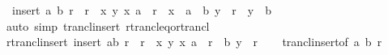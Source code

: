 \begin{isabellebody}
\ \ {\isachardoublequoteopen}{\isacharparenleft}{\kern0pt}insert\ {\isacharparenleft}{\kern0pt}a{\isacharcomma}{\kern0pt}\ b{\isacharparenright}{\kern0pt}\ r{\isacharparenright}{\kern0pt}\isactrlsup {\isacharplus}{\kern0pt}\ {\isacharequal}{\kern0pt}\ r\isactrlsup {\isacharplus}{\kern0pt}\ {\isasymunion}\ {\isacharbraceleft}{\kern0pt}{\isacharparenleft}{\kern0pt}x{\isacharcomma}{\kern0pt}\ y{\isacharparenright}{\kern0pt}{\isachardot}{\kern0pt}\ {\isacharparenleft}{\kern0pt}{\isacharparenleft}{\kern0pt}x{\isacharcomma}{\kern0pt}\ a{\isacharparenright}{\kern0pt}\ {\isasymin}\ r\isactrlsup {\isacharplus}{\kern0pt}\ {\isasymor}\ x\ {\isacharequal}{\kern0pt}\ a{\isacharparenright}{\kern0pt}\ {\isasymand}\ {\isacharparenleft}{\kern0pt}{\isacharparenleft}{\kern0pt}b{\isacharcomma}{\kern0pt}\ y{\isacharparenright}{\kern0pt}\ {\isasymin}\ r\isactrlsup {\isacharplus}{\kern0pt}\ {\isasymor}\ y\ {\isacharequal}{\kern0pt}\ b{\isacharparenright}{\kern0pt}{\isacharbraceright}{\kern0pt}{\isachardoublequoteclose}\isanewline
%
\isadelimproof
\ \ %
\endisadelimproof
%
\isatagproof
{}\isamarkupfalse%
\ {\isacharparenleft}{\kern0pt}auto\ simp{\isacharcolon}{\kern0pt}\ trancl{\isacharunderscore}{\kern0pt}insert\ rtrancl{\isacharunderscore}{\kern0pt}eq{\isacharunderscore}{\kern0pt}or{\isacharunderscore}{\kern0pt}trancl{\isacharparenright}{\kern0pt}%
\endisatagproof
{\isafoldproof}%
%
\isadelimproof
\isanewline
%
\endisadelimproof
\isanewline
{}\isamarkupfalse%
\ rtrancl{\isacharunderscore}{\kern0pt}insert{\isacharcolon}{\kern0pt}\ {\isachardoublequoteopen}{\isacharparenleft}{\kern0pt}insert\ {\isacharparenleft}{\kern0pt}a{\isacharcomma}{\kern0pt}b{\isacharparenright}{\kern0pt}\ r{\isacharparenright}{\kern0pt}\isactrlsup {\isacharasterisk}{\kern0pt}\ {\isacharequal}{\kern0pt}\ r\isactrlsup {\isacharasterisk}{\kern0pt}\ {\isasymunion}\ {\isacharbraceleft}{\kern0pt}{\isacharparenleft}{\kern0pt}x{\isacharcomma}{\kern0pt}\ y{\isacharparenright}{\kern0pt}{\isachardot}{\kern0pt}\ {\isacharparenleft}{\kern0pt}x{\isacharcomma}{\kern0pt}\ a{\isacharparenright}{\kern0pt}\ {\isasymin}\ r\isactrlsup {\isacharasterisk}{\kern0pt}\ {\isasymand}\ {\isacharparenleft}{\kern0pt}b{\isacharcomma}{\kern0pt}\ y{\isacharparenright}{\kern0pt}\ {\isasymin}\ r\isactrlsup {\isacharasterisk}{\kern0pt}{\isacharbraceright}{\kern0pt}{\isachardoublequoteclose}\isanewline
%
\isadelimproof
\ \ %
\endisadelimproof
%
\isatagproof
{}\isamarkupfalse%
\ trancl{\isacharunderscore}{\kern0pt}insert{\isacharbrackleft}{\kern0pt}of\ a\ b\ r{\isacharbrackright}{\kern0pt}\isanewline

\end{isabellebody}
